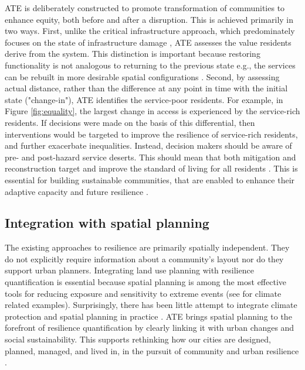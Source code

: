 \documentclass[9pt,twocolumn,twoside,lineno]{pnas-new}
\begin{document}
ATE is deliberately constructed to promote transformation of communities to enhance equity, both before and after a disruption. 
This is achieved primarily in two ways.
First, unlike the critical infrastructure approach, which predominately focuses on the state of infrastructure damage \cite{Cutter2010-vg}, ATE assesses the value residents derive from the system. 
This distinction is important because restoring functionality is not analogous to returning to the previous state e.g., the services can be rebuilt in more desirable spatial configurations \cite{Folke2010-bz}.
Second, by assessing actual distance, rather than the difference at any point in time with the initial state ("change-in"), ATE identifies the service-poor residents. 
For example, in Figure \ref{fig:equality}, the largest change in access is experienced by the service-rich residents.
If decisions were made on the basis of this differential, then interventions would be targeted to improve the resilience of service-rich residents, and further exacerbate inequalities.
Instead, decision makers should be aware of pre- and post-hazard service deserts. 
This should mean that both mitigation and reconstruction target and improve the standard of living for all residents \cite{Pantelic1991-qu}. 
This is essential for building sustainable communities, that are enabled to enhance their adaptive capacity and future resilience \cite{Saunders2015-uz}.

\subsection*{Integration with spatial planning}
The existing approaches to resilience are primarily spatially independent.
They do not explicitly require information about a community's layout nor do they support urban planners. 
Integrating land use planning with resilience quantification is essential because spatial planning is among the most effective tools for reducing exposure and sensitivity to extreme events \cite{Brunetta2019-ki, Campbell2006-in, Hurlimann2012-uj} (see \cite{Anderson2018-hr} for climate related examples). 
Surprisingly, there has been little attempt to integrate climate protection and spatial planning in practice \cite{Barnes2017-xf}.
ATE brings spatial planning to the forefront of resilience quantification by clearly linking it with urban changes and social sustainability.
This supports rethinking how our cities are designed, planned, managed, and lived in, in the pursuit of community and urban resilience \cite{Caldarice2019-tv}. 
\end{document}
